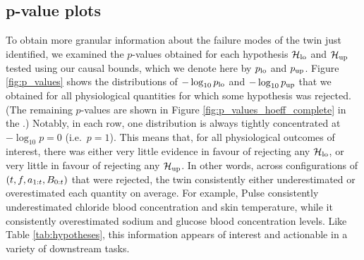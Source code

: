 


\subsection{p-value plots}

To obtain more granular information about the failure modes of the twin just identified, we examined the $p$-values obtained for each hypothesis $\mathcal{H}_{\mathrm{lo}}$ and $\mathcal{H}_{\mathrm{up}}$ tested using our causal bounds, which we denote here by $p_{\textup{lo}}$ and $p_{\textup{up}}$.
Figure \ref{fig:p_values} shows the distributions of $-\log_{10}{p_{\textup{lo}}}$ and $-\log_{10}{p_{\textup{up}}}$ that we obtained for all physiological quantities for which some hypothesis was rejected.
(The remaining $p$-values are shown in Figure \ref{fig:p_values_hoeff_complete} in the \AppendixName.)
Notably, in each row, one distribution is always tightly concentrated at $-\log_{10} p = 0$ (i.e.\ $p = 1$).
This means that, for all physiological outcomes of interest, there was either very little evidence in favour of rejecting any $\mathcal{H}_{\mathrm{lo}}$, or very little in favour of rejecting any $\mathcal{H}_{\mathrm{up}}$.
In other words, across configurations of $(t, f, a_{1:t}, B_{0:t})$ that were rejected, the twin consistently either underestimated or overestimated each quantity on average.
For example, Pulse consistently underestimated chloride blood concentration and skin temperature, while it consistently overestimated sodium and glucose blood concentration levels.
Like Table \ref{tab:hypotheses}, this information appears of interest and actionable in a variety of downstream tasks.


